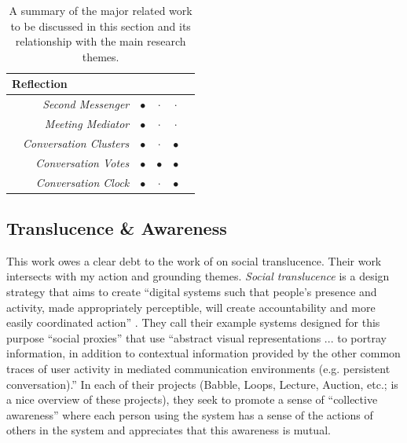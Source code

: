 \documentclass{tufte-handout}
\begin{document}
\begin{table}[tb]
\begin{tabular}{lrcccl}
\midrule
\multicolumn{2}{l}{Reflection} & & & & \\
\midrule
& \emph{Second Messenger} &$\bullet$& $\cdot$ & $\cdot$ & \citep{DiMicco:2007ie} \\
& \emph{Meeting Mediator} &$\bullet$& $\cdot$ & $\cdot$ & \citep{Kim:2008ip} \\
& \emph{Conversation Clusters} &$\bullet$& $\cdot$ &$\bullet$& \citep{Bergstrom:2009fe} \\
& \emph{Conversation Votes} &$\bullet$&$\bullet$&$\bullet$& \citep{Bergstrom:2009ej} \\
& \emph{Conversation Clock} &$\bullet$& $\cdot$ &$\bullet$& \citep{Bergstrom:2007je} \\
\bottomrule
\end{tabular}
\vspace{1em}
\caption{A summary of the major related work to be discussed in this section and its relationship with the main research themes.
}
\label{tab:related-work}
\end{table}

\subsection{Translucence \& Awareness}

This work owes a clear debt to the work of \citet{Erickson:2000kb} on social translucence. Their work intersects with my action and grounding themes. \emph{Social translucence} is a design strategy that aims to create ``digital systems such that people's presence and activity, made appropriately perceptible, will create accountability and more easily coordinated action''  \citep{Kellogg:2002ts}. They call their example systems designed for this purpose ``social proxies'' that use ``abstract visual representations ... to portray information, in addition to contextual information provided by the other common traces of user activity in mediated communication environments (e.g. persistent conversation).'' In each of their projects (Babble, Loops, Lecture, Auction, etc.; \citep{Erickson:2003td} is a nice overview of these projects), they seek to promote a sense of ``collective awareness'' where each person using the system has a sense of the actions of others in the system and appreciates that this awareness is mutual. 
\end{document}
